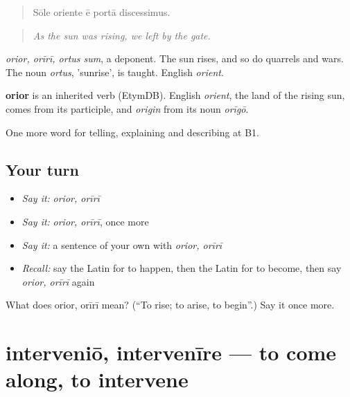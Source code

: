 \begin{quote}
Sōle oriente ē portā discessimus.
\end{quote}

\begin{quote}
\emph{As the sun was rising, we left by the gate.}
\end{quote}

\emph{orior, orīrī, ortus sum}, a deponent. The sun rises, and so do quarrels and wars. The noun \emph{ortus}, 'sunrise', is taught. English \emph{orient}.

\begin{cousinweb}
\textbf{orior} is an inherited verb (EtymDB). English \emph{orient}, the land of the rising sun, comes from its participle, and \emph{origin} from its noun \emph{orīgō}.
\end{cousinweb}

\begin{grammarlens}[title={What you've built}]
One more word for telling, explaining and describing at B1.
\end{grammarlens}

\subsection*{Your turn}
\begin{itemize}
\raggedright
  \item \emph{Say it:} \emph{orior, orīrī}
  \item \emph{Say it:} \emph{orior, orīrī}, once more
  \item \emph{Say it:} a sentence of your own with \emph{orior, orīrī}
  \item \emph{Recall:} say the Latin for to happen, then the Latin for to become, then say \emph{orior, orīrī} again
\end{itemize}

\begin{tcolorbox}[breakable,colback=teal!4,colframe=teal!35!black,title={Before you move on}]
What does orior, orīrī mean? (\textquotedblleft{}To rise; to arise, to begin\textquotedblright{}.) Say it once more.
\end{tcolorbox}
\section[interveniō, intervenīre]{interveniō, intervenīre — to come along, to intervene}

\label{lesson:LA-C298-intervenio}



